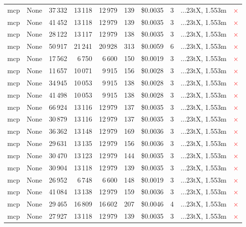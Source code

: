 \documentclass[a4paper,11pt]{article}
\begin{document}
\begin{table}[H]
{\begin{tabular}{l r r r r r r r l c}
mcp & None & 37\,332 & 13\,118 & 12\,979 & 139 & \$0.0035 & 3 & ...23tX, 1.553m & \textcolor{red}{\(\times\)} \\
mcp & None & 41\,452 & 13\,118 & 12\,979 & 139 & \$0.0035 & 3 & ...23tX, 1.553m & \textcolor{red}{\(\times\)} \\
mcp & None & 28\,122 & 13\,117 & 12\,979 & 138 & \$0.0035 & 3 & ...23tX, 1.553m & \textcolor{red}{\(\times\)} \\
mcp & None & 50\,917 & 21\,241 & 20\,928 & 313 & \$0.0059 & 6 & ...23tX, 1.553m & \textcolor{red}{\(\times\)} \\
mcp & None & 17\,562 & 6\,750 & 6\,600 & 150 & \$0.0019 & 3 & ...23tX, 1.553m & \textcolor{red}{\(\times\)} \\
mcp & None & 11\,657 & 10\,071 & 9\,915 & 156 & \$0.0028 & 3 & ...23tX, 1.553m & \textcolor{red}{\(\times\)} \\
mcp & None & 34\,945 & 10\,053 & 9\,915 & 138 & \$0.0028 & 3 & ...23tX, 1.553m & \textcolor{red}{\(\times\)} \\
mcp & None & 41\,498 & 10\,053 & 9\,915 & 138 & \$0.0028 & 3 & ...23tX, 1.553m & \textcolor{red}{\(\times\)} \\
mcp & None & 66\,924 & 13\,116 & 12\,979 & 137 & \$0.0035 & 3 & ...23tX, 1.553m & \textcolor{red}{\(\times\)} \\
mcp & None & 30\,879 & 13\,116 & 12\,979 & 137 & \$0.0035 & 3 & ...23tX, 1.553m & \textcolor{red}{\(\times\)} \\
mcp & None & 36\,362 & 13\,148 & 12\,979 & 169 & \$0.0036 & 3 & ...23tX, 1.553m & \textcolor{red}{\(\times\)} \\
mcp & None & 29\,631 & 13\,135 & 12\,979 & 156 & \$0.0036 & 3 & ...23tX, 1.553m & \textcolor{red}{\(\times\)} \\
mcp & None & 30\,470 & 13\,123 & 12\,979 & 144 & \$0.0035 & 3 & ...23tX, 1.553m & \textcolor{red}{\(\times\)} \\
mcp & None & 30\,904 & 13\,118 & 12\,979 & 139 & \$0.0035 & 3 & ...23tX, 1.553m & \textcolor{red}{\(\times\)} \\
mcp & None & 26\,952 & 6\,748 & 6\,600 & 148 & \$0.0019 & 3 & ...23tX, 1.553m & \textcolor{red}{\(\times\)} \\
mcp & None & 41\,084 & 13\,138 & 12\,979 & 159 & \$0.0036 & 3 & ...23tX, 1.553m & \textcolor{red}{\(\times\)} \\
mcp & None & 29\,465 & 16\,809 & 16\,602 & 207 & \$0.0046 & 4 & ...23tX, 1.553m & \textcolor{red}{\(\times\)} \\
mcp & None & 27\,927 & 13\,118 & 12\,979 & 139 & \$0.0035 & 3 & ...23tX, 1.553m & \textcolor{red}{\(\times\)} \\

\end{tabular}}
\end{table}
\end{document}
